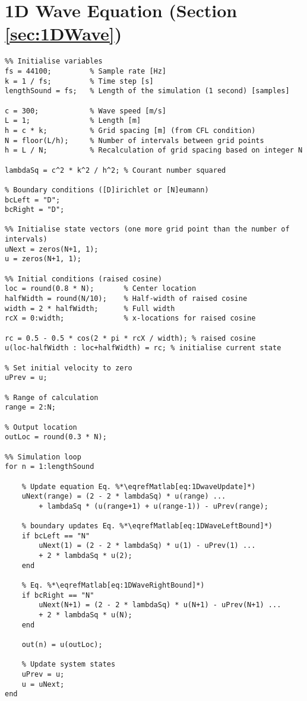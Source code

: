 \section{1D Wave Equation (Section \ref{sec:1DWave})}
\label{app:1DWave}
\begin{lstlisting}
%% Initialise variables
fs = 44100;         % Sample rate [Hz]
k = 1 / fs;         % Time step [s]
lengthSound = fs;   % Length of the simulation (1 second) [samples]             

c = 300;            % Wave speed [m/s]
L = 1;              % Length [m]
h = c * k;          % Grid spacing [m] (from CFL condition)
N = floor(L/h);     % Number of intervals between grid points
h = L / N;          % Recalculation of grid spacing based on integer N

lambdaSq = c^2 * k^2 / h^2; % Courant number squared

% Boundary conditions ([D]irichlet or [N]eumann)
bcLeft = "D";            
bcRight = "D"; 

%% Initialise state vectors (one more grid point than the number of intervals)
uNext = zeros(N+1, 1); 
u = zeros(N+1, 1);

%% Initial conditions (raised cosine)
loc = round(0.8 * N);       % Center location
halfWidth = round(N/10);    % Half-width of raised cosine
width = 2 * halfWidth;      % Full width
rcX = 0:width;              % x-locations for raised cosine

rc = 0.5 - 0.5 * cos(2 * pi * rcX / width); % raised cosine
u(loc-halfWidth : loc+halfWidth) = rc; % initialise current state  

% Set initial velocity to zero
uPrev = u;

% Range of calculation 
range = 2:N;

% Output location
outLoc = round(0.3 * N);

%% Simulation loop
for n = 1:lengthSound
    
    % Update equation Eq. %*\eqrefMatlab[eq:1DwaveUpdate]*)
    uNext(range) = (2 - 2 * lambdaSq) * u(range) ...
        + lambdaSq * (u(range+1) + u(range-1)) - uPrev(range); 
    
    % boundary updates Eq. %*\eqrefMatlab[eq:1DWaveLeftBound]*)
    if bcLeft == "N"
        uNext(1) = (2 - 2 * lambdaSq) * u(1) - uPrev(1) ...
        + 2 * lambdaSq * u(2); 
    end

    % Eq. %*\eqrefMatlab[eq:1DWaveRightBound]*)
    if bcRight == "N"
        uNext(N+1) = (2 - 2 * lambdaSq) * u(N+1) - uPrev(N+1) ...
        + 2 * lambdaSq * u(N); 
    end
    
    out(n) = u(outLoc);
    
    % Update system states
    uPrev = u;
    u = uNext;
end
\end{lstlisting}


